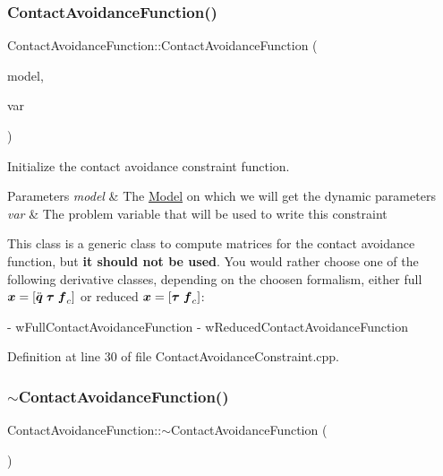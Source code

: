 \subsubsection{\texorpdfstring{Contact\+Avoidance\+Function()}{ContactAvoidanceFunction()}}
{\footnotesize\ttfamily Contact\+Avoidance\+Function\+::\+Contact\+Avoidance\+Function (\begin{DoxyParamCaption}\item[{const \hyperlink{classocra_1_1Model}{Model} \&}]{model,  }\item[{\hyperlink{classocra_1_1Variable}{Variable} \&}]{var }\end{DoxyParamCaption})}

Initialize the contact avoidance constraint function.


\begin{DoxyParams}{Parameters}
{\em model} & The \hyperlink{classocra_1_1Model}{Model} on which we will get the dynamic parameters \\
\hline
{\em var} & The problem variable that will be used to write this constraint\\
\hline
\end{DoxyParams}
This class is a generic class to compute matrices for the contact avoidance function, but {\bfseries it should not be used}. You would rather choose one of the following derivative classes, depending on the choosen formalism, either full $ \mbox{\boldmath${x}$} = [ \ddot{\mbox{\boldmath${q}$}} \; \mbox{\boldmath${\tau}$} \; \mbox{\boldmath${f}$}_c ] $ or reduced $ \mbox{\boldmath${x}$} = [ \mbox{\boldmath${\tau}$} \; \mbox{\boldmath${f}$}_c ] $\+: \begin{DoxyVerb} - wFullContactAvoidanceFunction
 - wReducedContactAvoidanceFunction\end{DoxyVerb}
 

Definition at line 30 of file Contact\+Avoidance\+Constraint.\+cpp.

\hypertarget{classocra_1_1ContactAvoidanceFunction_a5309c1fd586ed0292ee5eebfafacef9b}{}\label{classocra_1_1ContactAvoidanceFunction_a5309c1fd586ed0292ee5eebfafacef9b} 
\subsubsection{\texorpdfstring{$\sim$\+Contact\+Avoidance\+Function()}{~ContactAvoidanceFunction()}}
{\footnotesize\ttfamily Contact\+Avoidance\+Function\+::$\sim$\+Contact\+Avoidance\+Function (\begin{DoxyParamCaption}{ }\end{DoxyParamCaption})}

